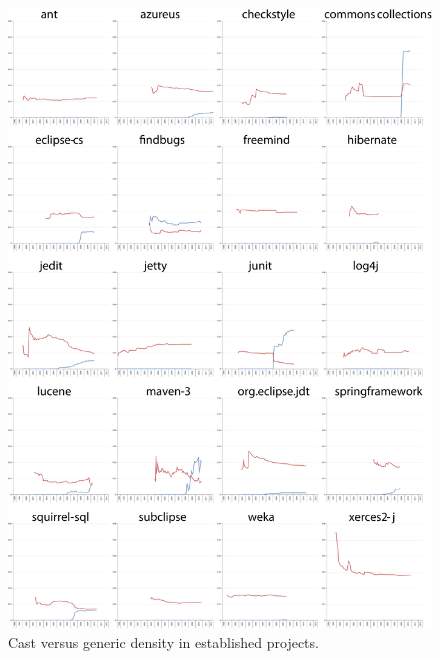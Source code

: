 \documentclass{svjour3}
\begin{document}
\begin{figure}[htb]
	\centering
	\includegraphics[width=\columnwidth]{cvg-1}
	\caption{Cast versus generic density in established projects.}
\end{figure}
\end{document}
